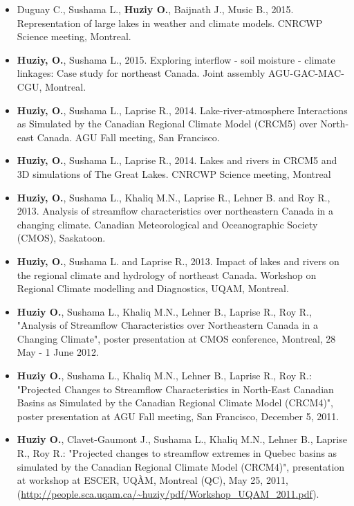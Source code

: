 \begin{itemize}


   \item Duguay C., Sushama L., \textbf{Huziy O.}, Baijnath J., Music B., 2015.
   Representation of large lakes in weather and climate models. CNRCWP Science
   meeting, Montreal.

   \item \textbf{Huziy, O.}, Sushama L., 2015. Exploring interflow - soil moisture - climate
   linkages: Case study for northeast Canada. Joint assembly AGU-GAC-MAC-CGU, Montreal.

   \item \textbf{Huziy, O.}, Sushama L., Laprise R., 2014. Lake-river-atmosphere Interactions
   as Simulated by the Canadian Regional Climate Model (CRCM5) over North-east
   Canada. AGU Fall meeting, San Francisco.

   \item \textbf{Huziy, O.}, Sushama L., Laprise R., 2014. Lakes and rivers in
   CRCM5 and 3D simulations of The Great Lakes. CNRCWP Science meeting, Montreal

   \item \textbf{Huziy, O.}, Sushama L., Khaliq M.N., Laprise R., Lehner B. and Roy
    R., 2013. Analysis of streamflow characteristics over northeastern Canada in a
    changing climate. Canadian Meteorological and Oceanographic Society (CMOS),
    Saskatoon.

   \item \textbf{Huziy, O.}, Sushama L. and Laprise R., 2013. Impact of lakes
   and rivers on the regional climate and hydrology of northeast Canada.
   Workshop on Regional Climate modelling and Diagnostics, UQAM, Montreal.

    \item \textbf{Huziy O.}, Sushama L., Khaliq M.N., Lehner B., Laprise R., Roy
    R., "Analysis of Streamflow Characteristics over Northeastern Canada in a
    Changing Climate", poster presentation at CMOS conference, Montreal, 28 May -
    1 June 2012.

    \item \textbf{Huziy O.}, Sushama L., Khaliq M.N., Lehner B., Laprise R., Roy
    R.: "Projected Changes to Streamflow Characteristics in North-East Canadian
    Basins as Simulated by the Canadian Regional Climate Model (CRCM4)", poster
    presentation at AGU Fall meeting, San Francisco, December 5, 2011.

    \item \textbf{Huziy O.}, Clavet-Gaumont J., Sushama L., Khaliq M.N., Lehner
    B., Laprise R., Roy R.: "Projected changes to streamflow extremes in Quebec
    basins as simulated by the Canadian Regional Climate Model (CRCM4)",
    presentation at workshop at ESCER, UQÀM, Montreal (QC), May 25, 2011,
    (\url{http://people.sca.uqam.ca/~huziy/pdf/Workshop_UQAM_2011.pdf}).
\end{itemize}
